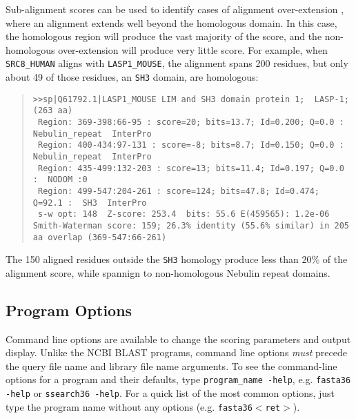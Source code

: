 \documentclass[11pt]{article}
\begin{document}
Sub-alignment scores can be used to identify cases of alignment
over-extension \cite{wrp136}, where an alignment extends well beyond
the homologous domain.  In this case, the homologous region will
produce the vast majority of the score, and the non-homologous
over-extension will produce very little score.  For example, when
\texttt{SRC8\_HUMAN} aligns with \texttt{LASP1\_MOUSE}, the alignment
spans 200 residues, but only about 49 of those residues, an
\texttt{SH3} domain, are homologous:

\begin{footnotesize}
\begin{quote}
\begin{verbatim}
>>sp|Q61792.1|LASP1_MOUSE LIM and SH3 domain protein 1;  LASP-1;              (263 aa)
 Region: 369-398:66-95 : score=20; bits=13.7; Id=0.200; Q=0.0 :  Nebulin_repeat  InterPro
 Region: 400-434:97-131 : score=-8; bits=8.7; Id=0.150; Q=0.0 :  Nebulin_repeat  InterPro
 Region: 435-499:132-203 : score=13; bits=11.4; Id=0.197; Q=0.0 :  NODOM :0
 Region: 499-547:204-261 : score=124; bits=47.8; Id=0.474; Q=92.1 :  SH3  InterPro
 s-w opt: 148  Z-score: 253.4  bits: 55.6 E(459565): 1.2e-06
Smith-Waterman score: 159; 26.3% identity (55.6% similar) in 205 aa overlap (369-547:66-261)
\end{verbatim}
\end{quote}
\end{footnotesize}
The 150 aligned residues outside the \texttt{SH3} homology produce
less than 20\% of the alignment score, while spannign to
non-homologous Nebulin repeat domains.

\subsection{Program Options}

Command line options are available to change the scoring parameters
and output display. Unlike the NCBI BLAST programs, command line
options \emph{must} precede the query file name and library file name
arguments.  To see the command-line options for a program and their
defaults, type \texttt{program\_name -help}, e.g. \texttt{fasta36
  -help} or \texttt{ssearch36 -help}. For a quick list of the most
common options, just type the program name without any options
(e.g. \texttt{fasta36$<$ret$>$}).
\end{document}
